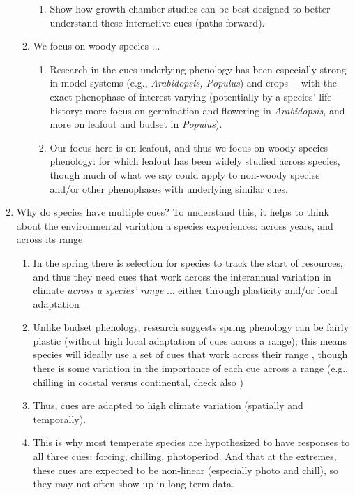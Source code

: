 \documentclass[11pt,letterpaper]{article}
\begin{document}
\begin{enumerate}
\begin{enumerate}
\begin{enumerate}
\item Show how growth chamber studies can be best designed to better understand these interactive cues (paths forward). 
\end{enumerate}
\item We focus on woody species ...
\begin{enumerate}
\item Research in the cues underlying phenology has been especially strong in model systems (e.g., \emph{Arabidopsis, Populus}) and crops \citep{cesaraccio2004}---with the exact phenophase of interest varying (potentially by a species' life history: more focus on germination and flowering in \emph{Arabidopsis}, and more on leafout and budset in \emph{Populus}).

\item Our focus here is on leafout, and thus we focus on woody species phenology: for which leafout has been widely studied across species, though much of what we say could apply to non-woody species and/or other phenophases with underlying similar cues. 
\end{enumerate}
\end{enumerate}
\item Why do species have multiple cues? To understand this, it helps to think about the environmental variation a species experiences: across years, and across its range
\begin{enumerate}
\item In the spring there is selection for species to track the start of resources, and thus they need cues that work across the interannual variation in climate \emph{across a species' range} ... either through plasticity and/or local adaptation
\item Unlike budset phenology, research suggests spring phenology can be fairly plastic (without high local adaptation of cues across a range); this means species will ideally use a set of cues that work across their range \citep{liepe2016}, though there is some variation in the importance of each cue across a range (e.g., chilling in coastal versus continental, check also \citet{legave2013})
\item Thus, cues are adapted to high climate variation (spatially and temporally).
\item This is why most temperate species are hypothesized to have responses to all three cues: forcing, chilling, photoperiod. And that at the extremes, these cues are expected to be non-linear (especially photo and chill), so they may not often show up in long-term data. 

\end{enumerate}
\end{enumerate}
\end{document}
